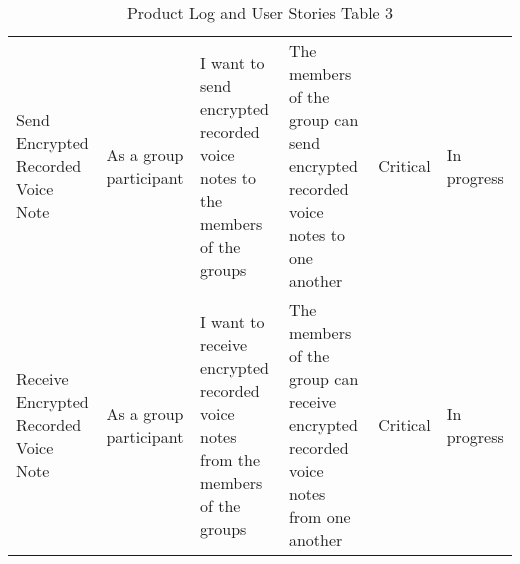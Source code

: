 \documentclass[a4paper]{article}
\begin{document}
\begin{table}[H]
\begin{tabular}{p{2cm} p{2.5cm} p{3cm} p{3cm} p{1cm} p{0.75cm}}
Send Encrypted Recorded Voice Note & As a group participant & I want to send encrypted recorded voice notes to the members of the groups & The members of the group can send encrypted recorded voice notes to one another & Critical & In progress\\ \cmidrule(l){2-6} %

Receive Encrypted Recorded Voice Note  & As a group participant & I want to receive encrypted recorded voice notes from the members of the groups & The members of the group can receive encrypted recorded voice notes from one another & Critical & In progress\\ %
\midrule %
\midrule %
\end{tabular}
\caption{Product Log and User Stories Table 3} %
\label{tab:template} %
\end{table}

\vfill
\clearpage


\end{document}
